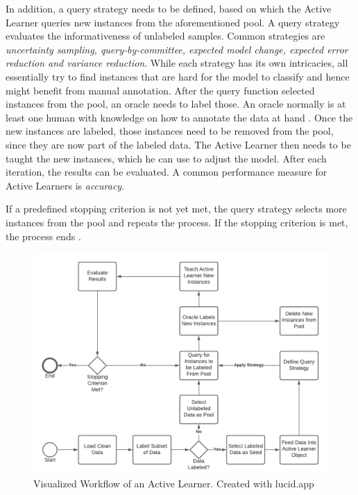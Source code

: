 \documentclass[11pt, a4paper]{article}
\begin{document}
In addition, a query strategy needs to be defined, based on which the Active Learner queries new instances from the aforementioned pool. 
A query strategy evaluates the informativeness of unlabeled samples. Common strategies are \emph{uncertainty sampling, query-by-committee, 
expected model change, expected error reduction and variance reduction}.
While each strategy has its own intricacies, all essentially try to find instances that are hard for the model to classify and hence might benefit from manual annotation. 
After the query function selected instances from the pool, an oracle needs to label those. An oracle normally is at 
least one human with knowledge on how to annotate the data at hand \citep{settles2009activeLL}. Once the new instances are labeled, 
those instances need to be removed from the pool, since they are now part of the labeled data. The Active Learner then needs 
to be taught the new instances, which he can use to adjust the model. After each iteration, the results can be evaluated. 
A common performance measure for Active Learners is \emph{accuracy}.

If a predefined stopping criterion is not yet met, the query strategy selects more instances from the pool and repeats the process.
If the stopping criterion is met, the process ends \citep{lu2019investigating}.

\begin{figure}
    \centering
    \includegraphics[width=\textwidth]{al_workflow.png}
    \caption{Visualized Workflow of an Active Learner. Created with lucid.app}
    \label{fig:AL_Workflow}
\end{figure}
\end{document}
